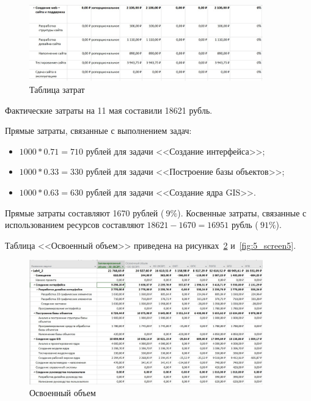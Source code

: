 \begin{figure}[H]
	\centering
	\includegraphics[width=0.9\textwidth]{img/lab5/screen1_3.jpg}
	\caption{Таблица затрат}
	\label{fig:5_screen3}
\end{figure}

Фактические затраты на 11 мая составили 18621 рубль.

Прямые затраты, связанные с выполнением задач:
\begin{itemize}[label=---]
	\item $1000 * 0.71 = 710$ рублей для задачи <<Создание интерфейса>>;
	\item $1000 * 0.33 = 330$ рублей для задачи <<Построение базы объектов>>;
	\item $1000 * 0.63 = 630$ рублей для задачи <<Создание ядра GIS>>.
\end{itemize}

Прямые затраты составляют 1670 рублей ($~9\%$).
Косвенные затраты, связанные с использованием ресурсов составляют $18621 - 1670 = 16951$ рубль ($~91\%$).

Таблица <<Освоенный объем>> приведена на рисунках~\ref{fig:5_screen4} и~\ref{fig:5_screen5}.

\begin{figure}[H]
	\centering
	\includegraphics[width=0.9\textwidth]{img/lab5/screen2_1.jpg}
	\caption{Освоенный объем}
	\label{fig:5_screen4}
\end{figure}

